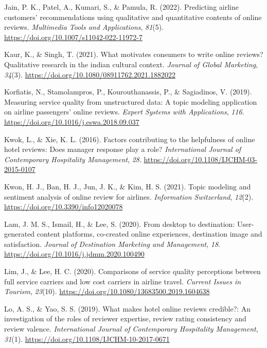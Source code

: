 \documentclass[
]{agujournal2019}
\newlength{\cslhangindent}
\newenvironment{CSLReferences}[2] %
 {\begin{list}{}{%
  \setlength{\itemindent}{0pt}
  \setlength{\leftmargin}{0pt}
  \setlength{\parsep}{0pt}
  \ifodd #1
   \setlength{\leftmargin}{\cslhangindent}
   \setlength{\itemindent}{-1\cslhangindent}
  \fi
  \setlength{\itemsep}{#2\baselineskip}}}
 {\end{list}}
\begin{document}
\begin{CSLReferences}{1}{0}
Jain, P. K., Patel, A., Kumari, S., \& Pamula, R. (2022). Predicting
airline customers' recommendations using qualitative and quantitative
contents of online reviews. \emph{Multimedia Tools and Applications},
\emph{81}(5). \url{https://doi.org/10.1007/s11042-022-11972-7}

Kaur, K., \& Singh, T. (2021). What motivates consumers to write online
reviews? Qualitative research in the indian cultural context.
\emph{Journal of Global Marketing}, \emph{34}(3).
\url{https://doi.org/10.1080/08911762.2021.1882022}

Korfiatis, N., Stamolampros, P., Kourouthanassis, P., \& Sagiadinos, V.
(2019). Measuring service quality from unstructured data: A topic
modeling application on airline passengers' online reviews. \emph{Expert
Systems with Applications}, \emph{116}.
\url{https://doi.org/10.1016/j.eswa.2018.09.037}

Kwok, L., \& Xie, K. L. (2016). Factors contributing to the helpfulness
of online hotel reviews: Does manager response play a role?
\emph{International Journal of Contemporary Hospitality Management},
\emph{28}. \url{https://doi.org/10.1108/IJCHM-03-2015-0107}

Kwon, H. J., Ban, H. J., Jun, J. K., \& Kim, H. S. (2021). Topic
modeling and sentiment analysis of online review for airlines.
\emph{Information Switzerland}, \emph{12}(2).
\url{https://doi.org/10.3390/info12020078}

Lam, J. M. S., Ismail, H., \& Lee, S. (2020). From desktop to
destination: User-generated content platforms, co-created online
experiences, destination image and satisfaction. \emph{Journal of
Destination Marketing and Management}, \emph{18}.
\url{https://doi.org/10.1016/j.jdmm.2020.100490}

Lim, J., \& Lee, H. C. (2020). Comparisons of service quality
perceptions between full service carriers and low cost carriers in
airline travel. \emph{Current Issues in Tourism}, \emph{23}(10).
\url{https://doi.org/10.1080/13683500.2019.1604638}

Lo, A. S., \& Yao, S. S. (2019). What makes hotel online reviews
credible?: An investigation of the roles of reviewer expertise, review
rating consistency and review valence. \emph{International Journal of
Contemporary Hospitality Management}, \emph{31}(1).
\url{https://doi.org/10.1108/IJCHM-10-2017-0671}


\end{CSLReferences}
\end{document}
